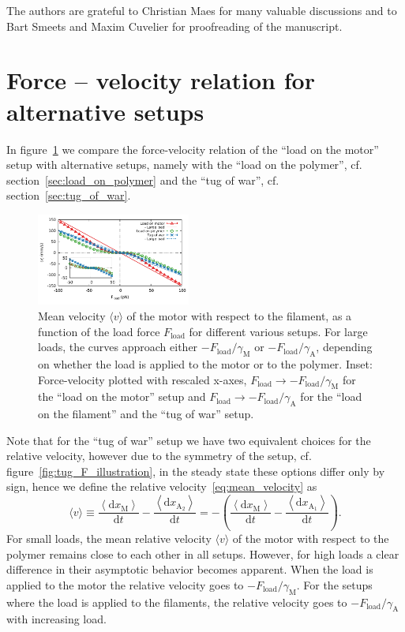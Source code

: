 \documentclass[aps,pre,twocolumn,showpacs,showkeys,superscriptaddress,floatfix]{revtex4-1}
\newcommand{\rmd}{{\mathrm d}}
\begin{document}
\begin{acknowledgments}
The authors are grateful to Christian Maes for many valuable discussions and to Bart Smeets and Maxim Cuvelier for proofreading of the manuscript.
\end{acknowledgments}

\appendix 
\section{Force -- velocity relation for alternative setups}
\label{sec:force_velocity_other}
In figure~\ref{fig:F_v_setups} we compare the force-velocity relation of the ``load on the motor'' setup with alternative setups,
namely with the ``load on the polymer'', cf. section~\ref{sec:load_on_polymer} and the ``tug of war'', cf. section~\ref{sec:tug_of_war}.
\begin{figure}[t]
\centering
\includegraphics[width=0.45\textwidth,height=!]{F_v_setups}
\caption{
\label{fig:F_v_setups} 
Mean velocity $\langle v \rangle$ of the motor with respect to the filament, as a function of the load force $F_\text{load}$ for different various setups.
For large loads, the curves approach either  $ - F_\text{load} / \gamma_\text{M}$ or $ - F_\text{load} / \gamma_\text{A}$, depending on whether the load is applied to the motor or to the polymer. 
Inset: Force-velocity plotted with rescaled x-axes,
$F_\text{load} \to - F_\text{load} / \gamma_\text{M}$ for the ``load on the motor'' setup 
and $F_\text{load} \to - F_\text{load} / \gamma_\text{A}$ for the ``load on the filament'' and the ``tug of war'' setup. 
}
\end{figure}
Note that for the ``tug of war'' setup we have two equivalent choices for the relative velocity,
however due to the symmetry of the setup, cf. figure~\ref{fig:tug_F_illustration}, in the steady state these options differ only by sign, 
hence we define the relative velocity~\eqref{eq:mean_velocity} as 
\[
\langle v \rangle 
\equiv \frac{ \left\langle \rmd x_\text{M} \right\rangle }{ \rmd t }
- \frac{ \left\langle \rmd x_{\text{A}_2} \right\rangle }{ \rmd t }
= - \left( \frac{ \left\langle \rmd x_\text{M} \right\rangle }{ \rmd t }
- \frac{ \left\langle \rmd x_{\text{A}_1} \right\rangle }{ \rmd t } \right) .
\]
For small loads, the mean relative velocity $\langle v \rangle$ of the motor with respect to the polymer remains close to each other in all setups.
However, for high loads a clear difference in their asymptotic behavior becomes apparent.
When the load is applied to the motor the relative velocity goes to $ - F_\text{load} / \gamma_\text{M}$.
For the setups where the load is applied to the filaments, the relative velocity goes to $ - F_\text{load} / \gamma_\text{A}$ with increasing load.
\end{document}
